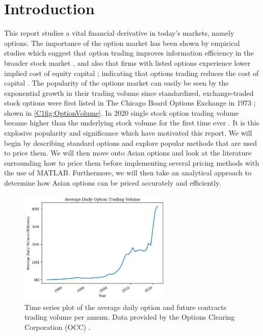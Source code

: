\chapter{Introduction}

This report studies a vital financial derivative in today's markets, namely options. The importance of the option market has been shown by empirical studies which suggest that option trading improves information efficiency in the broader stock market \cite{PanInfoEffic,li2021effect}, and also that firms with listed options experience lower implied cost of equity capital \cite{naikerLowEquity}; indicating that options trading reduces the cost of capital \cite{li2021effect}. The popularity of the options market can easily be seen by the exponential growth in their trading volume since standardized, exchange-traded stock options were first listed in The Chicago Board Options Exchange in 1973 \cite{markham2002financial}; shown in \autoref{C1fig:OptionVolume}. In 2020 single stock option trading volume became higher than the underlying stock volume for the first time ever \cite{yahooOptions}. 
\nline
It is this explosive popularity and significance which have motivated this report. We will begin by describing standard options and explore popular methods that are used to price them. We will then move onto Asian options and look at the literature surrounding how to price them before implementing several pricing methods with the use of \textsc{MATLAB}. Furthermore, we will then take an analytical approach to determine how Asian options can be priced accurately and efficiently.

\begin{figure}[H]
    \centering
    \includegraphics[width=0.65\textwidth]{Chapters/C1/plots/OptionVolume.png}
    \caption{Time series plot of the average daily option and future contracts trading volume per annum. Data provided by the Options Clearing Corporation (OCC) \cite{THEOCC}. 
    }
    \label{C1fig:OptionVolume}
\end{figure}

